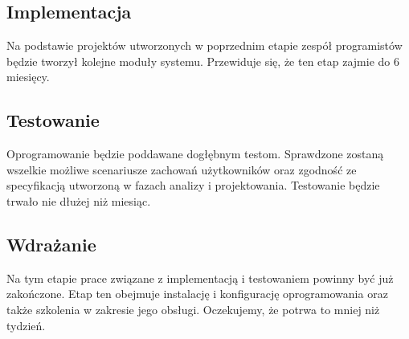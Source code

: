 \documentclass [11pt, a4paper, leqno] {article}
\begin{document}
\subsection{Implementacja}
\noindent
Na podstawie projektów utworzonych w poprzednim etapie zespół programistów będzie tworzył kolejne moduły systemu. Przewiduje się, że ten etap zajmie do 6 miesięcy.

\subsection{Testowanie}
\noindent
Oprogramowanie będzie poddawane dogłębnym testom. Sprawdzone zostaną wszelkie możliwe scenariusze zachowań użytkowników oraz zgodność ze specyfikacją utworzoną w fazach analizy i projektowania. Testowanie będzie trwało nie dłużej niż miesiąc.

\subsection{Wdrażanie}
\noindent
Na tym etapie prace związane z implementacją i testowaniem powinny być już zakończone. Etap ten obejmuje instalację i konfigurację oprogramowania oraz także szkolenia w zakresie jego obsługi. Oczekujemy, że potrwa to mniej niż tydzień.
\end{document}
